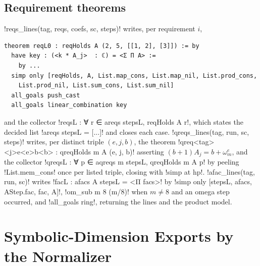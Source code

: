 {{{\subsection{Requirement theorems}

\lexpy!reqs_lines(tag, reqs, coefs, sc, steps)! writes, per requirement $i$,
\begin{lstlisting}[style=lexlean]
theorem reqL0 : reqHolds A (2, 5, [[1, 2], [3]]) := by
  have key : (<k * A_j>  : ℂ) = <Σ Π A> :=
    by ...
  simp only [reqHolds, A, List.map_cons, List.map_nil, List.prod_cons,
    List.prod_nil, List.sum_cons, List.sum_nil]
  all_goals push_cast
  all_goals linear_combination key
\end{lstlisting}
and the collector \lexlean!reqsL : ∀ r ∈ areqs stepsL, reqHolds A r!, which states the decided list
\lexlean!areqs stepsL = [...]! and closes each case. \lexpy!qreqs_lines(tag, run, sc, steps)! writes,
per distinct triple $(e, j, b)$, the theorem \lexlean!qreq<tag><j>e<e>b<b> : qreqHolds m A (e, j, b)!
asserting $(b+1)A_j = b + \omega_m^{e}$, and the collector \lexlean!qreqsL : ∀ p ∈ aqreqs m stepsL, qreqHolds m A p! by peeling \lexlean!List.mem_cons! once per listed triple, closing with
\lexlean!simp at hp!. \lexpy!afac_lines(tag, run, sc)! writes
\lexlean!facL : afacs A stepsL = <Π facs>! by \lexlean!simp only [stepsL, afacs, AStep.fac, fac, A]!,
\lexlean!om_sub m 8 (m/8)! when $m\neq 8$ and an omega step occurred, and \lexlean!all_goals ring!,
returning the lines and the product model.

\section{Symbolic-Dimension Exports by the Normalizer}\label{sec:lean-export-sym}

}}}
